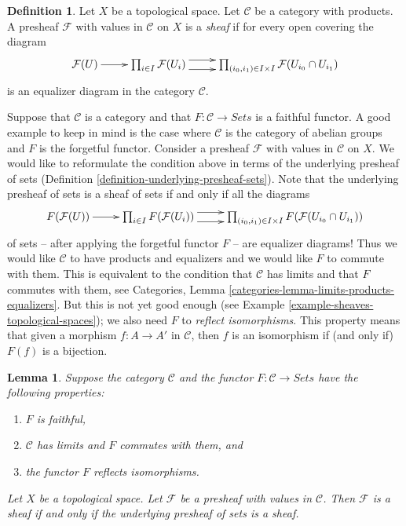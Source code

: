 \documentclass{stacks-project}
\theoremstyle{plain}
\newtheorem{lemma}[subsection]{Lemma}
\theoremstyle{definition}
\newtheorem{definition}[subsection]{Definition}
\theoremstyle{remark}
\numberwithin{equation}{subsection}
\begin{document}
\begin{definition}
\label{definition-sheaf-values-in-category}
Let $X$ be a topological space. Let $\mathcal{C}$ be
a category with products. A presheaf $\mathcal{F}$ with
values in $\mathcal{C}$ on $X$ is a {\it sheaf}
if for every open covering the diagram
$$
\xymatrix{
\mathcal{F}(U) \ar[r]
&
\prod\nolimits_{i\in I}
\mathcal{F}(U_i)
\ar@<1ex>[r] \ar@<-1ex>[r]
&
\prod\nolimits_{(i_0, i_1) \in I \times I}
\mathcal{F}(U_{i_0} \cap U_{i_1})
}
$$
is an equalizer diagram in the category $\mathcal{C}$.
\end{definition}

\noindent
Suppose that $\mathcal{C}$ is a category and that
$F : \mathcal{C} \to \textit{Sets}$ is a faithful functor.
A good example to keep in mind is the case where $\mathcal{C}$
is the category of abelian groups and $F$ is the forgetful functor.
Consider a presheaf $\mathcal{F}$ with values in $\mathcal{C}$ on $X$.
We would like to reformulate the condition above in terms
of the underlying presheaf of sets
(Definition \ref{definition-underlying-presheaf-sets}).
Note that the underlying
presheaf of sets is a sheaf of sets if and only if all the
diagrams
$$
\xymatrix{
F(\mathcal{F}(U)) \ar[r]
&
\prod\nolimits_{i\in I}
F(\mathcal{F}(U_i))
\ar@<1ex>[r] \ar@<-1ex>[r]
&
\prod\nolimits_{(i_0, i_1) \in I \times I}
F(\mathcal{F}(U_{i_0} \cap U_{i_1}))
}
$$
of sets -- after applying the forgetful functor $F$ -- are
equalizer diagrams! Thus we would like $\mathcal{C}$ to have
products and equalizers and we would like $F$ to commute with
them. This is equivalent to the condition that $\mathcal{C}$
has limits and that $F$ commutes with them, see
Categories, Lemma \ref{categories-lemma-limits-products-equalizers}.
But this is not yet good enough
(see Example \ref{example-sheaves-topological-spaces});
we also need $F$ to {\it reflect isomorphisms}.
This property means that given a morphism
$f : A \to A'$ in $\mathcal{C}$, then $f$ is
an isomorphism if (and only if) $F(f)$ is a bijection.

\begin{lemma}
\label{lemma-sheaves-structure}
Suppose the category $\mathcal{C}$ and
the functor $F : \mathcal{C} \to \textit{Sets}$
have the following properties:
\begin{enumerate}
\item $F$ is faithful,
\item $\mathcal{C}$ has limits and $F$ commutes with them, and
\item the functor $F$ reflects isomorphisms.
\end{enumerate}
Let $X$ be a topological space. Let $\mathcal{F}$
be a presheaf with values in $\mathcal{C}$.
Then $\mathcal{F}$ is a sheaf if and only if the
underlying presheaf of sets is a sheaf.
\end{lemma}
\end{document}
